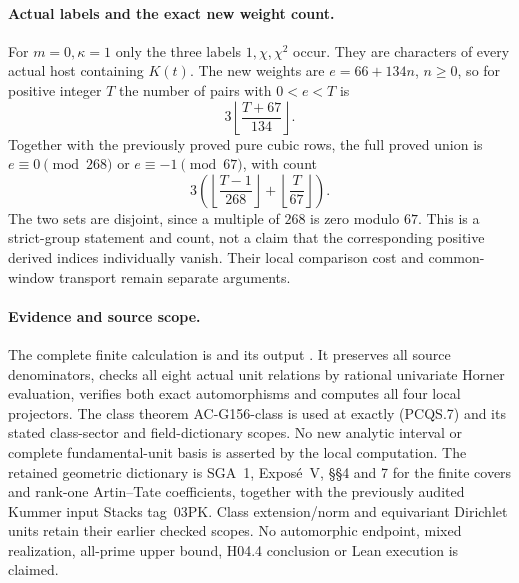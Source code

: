 \paragraph{Actual labels and the exact new weight count.}
For $m=0,\kappa=1$ only the three labels $1,\chi,\chi^2$
occur.  They are characters of every actual host containing $K(t)$.
The new weights are $e=66+134n$, $n\geq0$, so for positive integer
$T$ the number of pairs with $0<e<T$ is
\[
                        3\left\lfloor\frac{T+67}{134}\right\rfloor.
 \tag{PCQS.21}
\]
Together with the previously proved pure cubic rows, the full
proved union is $e\equiv0\pmod{268}$ or $e\equiv-1\pmod{67}$,
with count
\[
              3\left(\left\lfloor\frac{T-1}{268}\right\rfloor
                         +\left\lfloor\frac T{67}\right\rfloor\right).
 \tag{PCQS.22}
\]
The two sets are disjoint, since a multiple of $268$ is zero
modulo $67$.
This is a strict-group statement and count, not a claim that
the corresponding positive derived indices individually vanish.
Their local comparison cost and common-window transport remain
separate arguments.

\paragraph{Evidence and source scope.}
The complete finite calculation is
 and its output
.
It preserves all source denominators, checks all eight actual
unit relations by rational univariate Horner evaluation, verifies
both exact automorphisms and computes all four local projectors.
The class theorem AC-G156-class is used at exactly (PCQS.7)
and its stated class-sector and field-dictionary scopes.
No new analytic interval or complete fundamental-unit basis
is asserted by the local computation.
The retained geometric dictionary is SGA~1, Expos\'e~V,
\S\S4 and 7 for the finite covers and rank-one Artin--Tate
coefficients, together with the previously audited Kummer input
Stacks tag~03PK.  Class extension/norm and equivariant Dirichlet
units retain their earlier checked scopes.
No automorphic endpoint, mixed realization, all-prime upper bound,
H04.4 conclusion or Lean execution is claimed.
